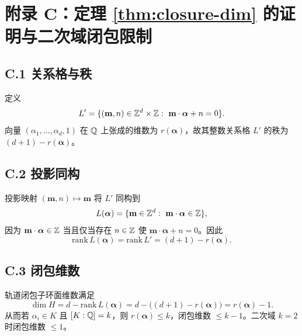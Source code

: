 \section{附录 C：定理 \ref{thm:closure-dim} 的证明与二次域闭包限制}
\label{app:closure-dim-proof}

\subsection*{C.1 关系格与秩}

定义
\[
L'=\{(\mathbf{m},n)\in\ZZ^d\times\ZZ:\ \mathbf{m}\cdot\boldsymbol{\alpha}+n=0\}.
\]
向量 $(\alpha_1,\dots,\alpha_d,1)$ 在 $\mathbb{Q}$ 上张成的维数为 $r(\boldsymbol{\alpha})$，故其整数关系格 $L'$ 的秩为 $(d+1)-r(\boldsymbol{\alpha})$。

\subsection*{C.2 投影同构}

投影映射 $(\mathbf{m},n)\mapsto \mathbf{m}$ 将 $L'$ 同构到
\[
L(\boldsymbol{\alpha})=\{\mathbf{m}\in\ZZ^d:\ \mathbf{m}\cdot\boldsymbol{\alpha}\in\ZZ\},
\]
因为 $\mathbf{m}\cdot\boldsymbol{\alpha}\in\mathbb{Z}$ 当且仅当存在 $n\in\mathbb{Z}$ 使 $\mathbf{m}\cdot\boldsymbol{\alpha}+n=0$。因此
\[
\mathrm{rank}\,L(\boldsymbol{\alpha})=\mathrm{rank}\,L'=(d+1)-r(\boldsymbol{\alpha}).
\]

\subsection*{C.3 闭包维数}

轨道闭包子环面维数满足
\[
\dim H=d-\mathrm{rank}\,L(\boldsymbol{\alpha})
=d-\bigl((d+1)-r(\boldsymbol{\alpha})\bigr)=r(\boldsymbol{\alpha})-1.
\]
从而若 $\alpha_i\in K$ 且 $[K:\mathbb{Q}]=k$，则 $r(\boldsymbol{\alpha})\le k$，闭包维数 $\le k-1$。二次域 $k=2$ 时闭包维数 $\le 1$。

